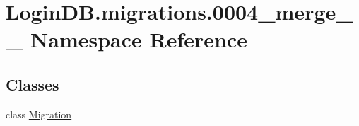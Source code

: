 \hypertarget{namespace_login_d_b_1_1migrations_1_10004__merge__20201206__1751}{}\section{Login\+D\+B.\+migrations.0004\+\_\+merge\+\_\+\_ Namespace Reference}
\label{namespace_login_d_b_1_1migrations_1_10004__merge__20201206__1751}
\subsection*{Classes}
\begin{DoxyCompactItemize}
\item 
class \hyperlink{class_login_d_b_1_1migrations_1_10004__merge__20201206__1751_1_1_migration}{Migration}
\end{DoxyCompactItemize}
